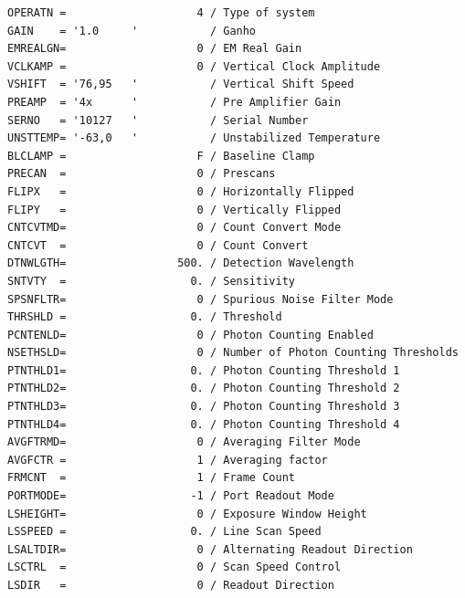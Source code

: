 \documentclass[
  letterpaper,
  DIV=11,
  numbers=noendperiod]{scrreprt}
\begin{document}
\begin{verbatim}
OPERATN =                    4 / Type of system                                 
GAIN    = '1.0     '           / Ganho                                          
EMREALGN=                    0 / EM Real Gain                                   
VCLKAMP =                    0 / Vertical Clock Amplitude                       
VSHIFT  = '76,95   '           / Vertical Shift Speed                           
PREAMP  = '4x      '           / Pre Amplifier Gain                             
SERNO   = '10127   '           / Serial Number                                  
UNSTTEMP= '-63,0   '           / Unstabilized Temperature                       
BLCLAMP =                    F / Baseline Clamp                                 
PRECAN  =                    0 / Prescans                                       
FLIPX   =                    0 / Horizontally Flipped                           
FLIPY   =                    0 / Vertically Flipped                             
CNTCVTMD=                    0 / Count Convert Mode                             
CNTCVT  =                    0 / Count Convert                                  
DTNWLGTH=                 500. / Detection Wavelength                           
SNTVTY  =                   0. / Sensitivity                                    
SPSNFLTR=                    0 / Spurious Noise Filter Mode                     
THRSHLD =                   0. / Threshold                                      
PCNTENLD=                    0 / Photon Counting Enabled                        
NSETHSLD=                    0 / Number of Photon Counting Thresholds           
PTNTHLD1=                   0. / Photon Counting Threshold 1                    
PTNTHLD2=                   0. / Photon Counting Threshold 2                    
PTNTHLD3=                   0. / Photon Counting Threshold 3                    
PTNTHLD4=                   0. / Photon Counting Threshold 4                    
AVGFTRMD=                    0 / Averaging Filter Mode                          
AVGFCTR =                    1 / Averaging factor                               
FRMCNT  =                    1 / Frame Count                                    
PORTMODE=                   -1 / Port Readout Mode                              
LSHEIGHT=                    0 / Exposure Window Height                         
LSSPEED =                   0. / Line Scan Speed                                
LSALTDIR=                    0 / Alternating Readout Direction                  
LSCTRL  =                    0 / Scan Speed Control                             
LSDIR   =                    0 / Readout Direction                              

\end{verbatim}
\end{document}
